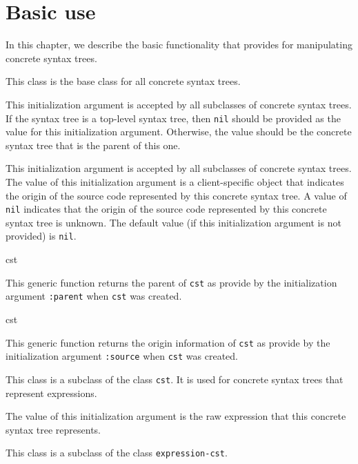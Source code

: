 \chapter{Basic use}

In this chapter, we describe the basic functionality that \sysname{}
provides for manipulating concrete syntax trees.


This class is the base class for all concrete syntax trees.


This initialization argument is accepted by all subclasses of concrete
syntax trees.  If the syntax tree is a top-level syntax tree, then
\texttt{nil} should be provided as the value for this initialization
argument.  Otherwise, the value should be the concrete syntax tree
that is the parent of this one.


This initialization argument is accepted by all subclasses of concrete
syntax trees.  The value of this initialization argument is a
client-specific object that indicates the origin of the source code
represented by this concrete syntax tree.  A value of \texttt{nil}
indicates that the origin of the source code represented by this concrete
syntax tree is unknown.  The default value (if this initialization
argument is not provided) is \texttt{nil}.

 {cst}

This generic function returns the parent of \texttt{cst} as provide by
the initialization argument \texttt{:parent} when \texttt{cst} was
created.

 {cst}

This generic function returns the origin information of \texttt{cst}
as provide by the initialization argument \texttt{:source} when
\texttt{cst} was created.


This class is a subclass of the class \texttt{cst}.  It is used for
concrete syntax trees that represent \commonlisp{} expressions.


The value of this initialization argument is the raw \commonlisp{}
expression that this concrete syntax tree represents.


This class is a subclass of the class \texttt{expression-cst}.
